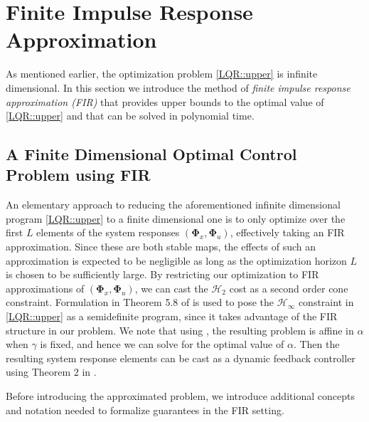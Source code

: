 \documentclass{article}[12pt]
\begin{document}
\section{Finite Impulse Response Approximation}
\label{sec::approx}
As mentioned earlier, the optimization problem \eqref{LQR::upper} is infinite dimensional.
In this section we introduce the method of \textit{finite impulse response approximation (FIR)} that provides upper bounds to the optimal value of \eqref{LQR::upper} and that can be solved in polynomial time.

\subsection{A Finite Dimensional Optimal Control Problem using FIR}
An elementary approach to reducing the aforementioned infinite dimensional program \eqref{LQR::upper} to a finite dimensional
one is to only optimize over the first $L$ elements of the system responses $(\mathbf{\Phi}_x,\mathbf{\Phi}_u)$,
effectively taking an FIR approximation. 
Since these are both stable maps,
the effects of such an approximation is expected to be negligible as long as the optimization horizon $L$ is chosen to be sufficiently large.
By restricting our optimization to FIR approximations of $(\mathbf{\Phi}_x,\mathbf{\Phi}_u)$, we can cast the $\mathcal{H}_2$ cost as a second order cone constraint. 
Formulation in Theorem 5.8 of \cite{dumitrescu2007positive} is used to pose the $\mathcal{H}_\infty$ constraint in \eqref{LQR::upper} as
a semidefinite program, since it takes advantage of the FIR structure in our problem.
We note that using \cite{dumitrescu2007positive}, the resulting
problem is affine in $\alpha$ when $\gamma$ is fixed, and hence we can solve for the optimal value of $\alpha$. 
Then the resulting system response elements can be cast as a dynamic feedback controller using Theorem 2 in \cite{anderson2017structured}.

Before introducing the approximated problem, we introduce additional concepts and notation needed to formalize guarantees in the FIR setting.
\end{document}
